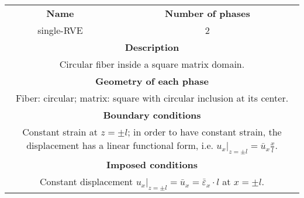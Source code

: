 \begin{table}[htbp]
\footnotesize
  \centering
  \small
    \begin{tabularx}{\textwidth}{cc}
    \toprule
        \midrule
    \textbf{Name} & \textbf{Number of phases}\\
     single-RVE&2\\
    \midrule
    \multicolumn{2}{X}{\textbf{Description}}\\
    \multicolumn{2}{X}{Circular fiber inside a square matrix domain.}\\
    \midrule
    \multicolumn{2}{X}{\textbf{Geometry of each phase}}\\
    \multicolumn{2}{X}{Fiber: circular; matrix: square with circular inclusion at its center.}\\
    \midrule
    \multicolumn{2}{X}{\textbf{Boundary conditions}}\\
    \multicolumn{2}{X}{Constant strain at $z=\pm l$; in order to have constant strain, the displacement has a linear functional form, i.e. $u_{x}|_{z=\pm l}=\bar{u}_{x}\frac{x}{l}$.}\\
    \midrule
    \multicolumn{2}{X}{\textbf{Imposed conditions}}\\
    \multicolumn{2}{X}{Constant displacement $u_{x}|_{z=\pm l}=\bar{u}_{x}=\bar{\varepsilon}_{x}\cdot l$ at $x=\pm l$.}\\
    \midrule
    \bottomrule
    \end{tabularx}%
  \label{tab:geom_tab1}%
\end{table}%

